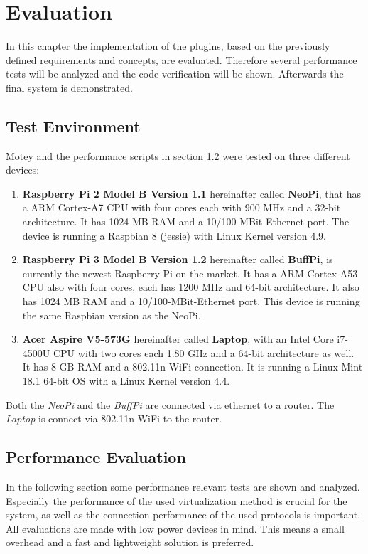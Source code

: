 \chapter{Evaluation}
\label{chapter:evaluation}
\minitoc\vspace{.5cm}
In this chapter the implementation of the plugins, based on the previously defined requirements and concepts, are evaluated.
Therefore several performance tests will be analyzed and the code verification will be shown.
Afterwards the final system is demonstrated.

\section{Test Environment}
\label{section:test-environment}
Motey and the performance scripts in section \ref{section:performance-evaluation} were tested on three different devices:\newline
\begin{enumerate}
  \item \textbf{Raspberry Pi 2 Model B Version 1.1} hereinafter called \textbf{NeoPi}, that has a ARM Cortex-A7 \ac{CPU} with four cores each with 900 MHz and a 32-bit architecture. It has 1024 MB \ac{RAM} and a 10/100-MBit-Ethernet port. The device is running a Raspbian 8 (jessie) with Linux Kernel version 4.9.
  \item \textbf{Raspberry Pi 3 Model B Version 1.2} hereinafter called \textbf{BuffPi}, is currently the newest Raspberry Pi on the market. It has a ARM Cortex-A53 \ac{CPU} also with four cores, each has 1200 MHz and 64-bit architecture. It also has 1024 MB \ac{RAM} and a 10/100-MBit-Ethernet port.  This device is running the same Raspbian version as the NeoPi.
  \item \textbf{Acer Aspire V5-573G} hereinafter called \textbf{Laptop}, with an Intel Core i7-4500U \ac{CPU} with two cores each 1.80 GHz and a 64-bit architecture as well. It has 8 GB \ac{RAM} and a 802.11n WiFi connection. It is running a Linux Mint 18.1  64-bit \ac{OS} with a Linux Kernel version 4.4.
\end{enumerate}
\bigskip

Both the \textit{NeoPi} and the \textit{BuffPi} are connected via ethernet to a router.
The \textit{Laptop} is connect via 802.11n WiFi to the router.

\section{Performance Evaluation}
\label{section:performance-evaluation}
In the following section some performance relevant tests are shown and analyzed.
Especially the performance of the used virtualization method is crucial for the system, as well as the connection performance of the used protocols is important.
All evaluations are made with low power devices in mind.
This means a small overhead and a fast and lightweight solution is preferred.

